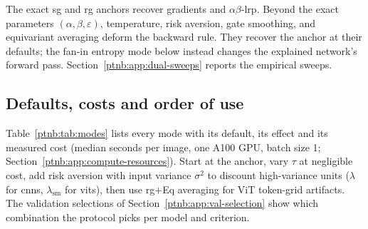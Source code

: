 The exact \ac{sg} and \ac{rg} anchors recover gradients and $\alpha\beta$-\ac{lrp}.
Beyond the exact parameters $(\alpha,\beta,\varepsilon)$, temperature, risk aversion, gate smoothing,
and equivariant averaging deform the backward rule. They recover the anchor at their defaults;
the fan-in entropy mode below instead changes the explained network's forward pass.
Section~\ref{ptnb:app:dual-sweeps} reports the empirical sweeps.

\subsection{Defaults, costs and order of use}\label{ptnb:app:mode-guide}

Table~\ref{ptnb:tab:modes} lists every mode with its default, its effect and its measured cost
(median seconds per image, one A100 GPU, batch size 1; Section~\ref{ptnb:app:compute-resources}). Start at the anchor,
vary $\tau$ at negligible cost, add risk aversion with input variance $\sigma^2$ to discount
high-variance units ($\lambda$ for \acp{cnn}, $\lambda_{\mathrm{sm}}$ for \acp{vit}), then use
\ac{rg}+Eq averaging for ViT token-grid artifacts. The validation selections of Section~\ref{ptnb:app:val-selection} show which combination
the protocol picks per model and criterion.

